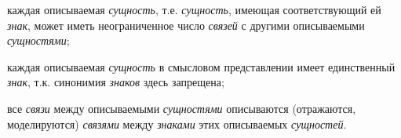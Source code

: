 \begin{SCn}
{{\begin{scnitemize}
	\item каждая описываемая \textit{сущность}, т.е. \textit{сущность}, имеющая соответствующий ей \textit{знак}, может иметь неограниченное число \textit{связей} с другими описываемыми \textit{сущностями};
	\item каждая описываемая \textit{сущность} в смысловом представлении имеет единственный \textit{знак}, т.к. синонимия \textit{знаков} здесь запрещена;
	\item все \textit{связи} между описываемыми \textit{сущностями} описываются (отражаются, моделируются) \textit{связями} между \textit{знаками} этих описываемых \textit{сущностей}.
\end{scnitemize}}
}


\end{SCn}
